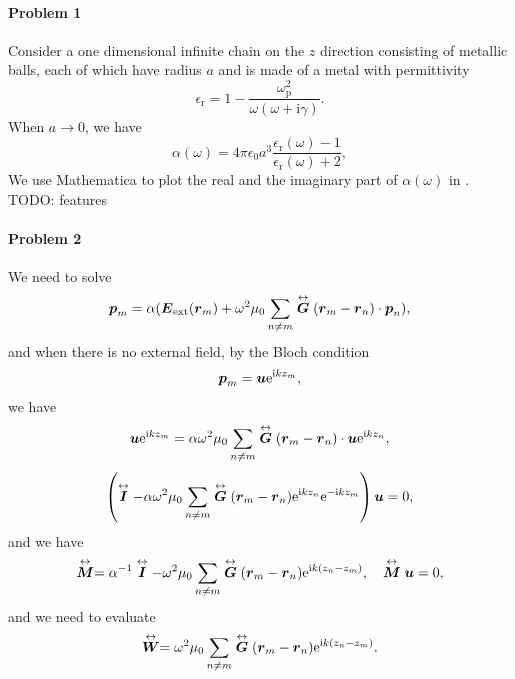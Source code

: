 \documentclass[hyperref, a4paper]{article}
\newcommand*{\ii}{\mathrm{i}}
\newcommand*{\ee}{\mathrm{e}}
\renewcommand{\tensor}[1]{ \stackrel{\leftrightarrow}{\vb*{#1}}}
\begin{document}
\paragraph{Problem 1} Consider a one dimensional infinite chain on the $z$ direction consisting of metallic balls, 
each of which have radius $a$ and is made of a metal with permittivity
\begin{equation}
    \epsilon_\text{r} = 1 - \frac{\omega_\text{p}^2}{\omega (\omega + \ii \gamma)}.
\end{equation} 
When $a \to 0$, we have
\begin{equation}
    \alpha(\omega) = 4 \pi \epsilon_0 a^3 \frac{\epsilon_\text{r}(\omega) - 1}{\epsilon_\text{r}(\omega) + 2},
\end{equation}
We use Mathematica to plot the real and the imaginary part of $\alpha(\omega)$ in . 
TODO: features

\paragraph{}

\paragraph{Problem 2} We need to solve 
\begin{equation}
    \vb*{p}_m = \alpha (\vb*{E}_\text{ext}(\vb*{r}_m) + \omega^2 \mu_0 \sum_{n \neq m} \tensor{\vb*{G}}(\vb*{r}_m - \vb*{r}_n) \cdot \vb*{p}_n),
    \label{eq:p-ext}
\end{equation}
and when there is no external field, by the Bloch condition 
\begin{equation}
    \vb*{p}_m = \vb*{u} \ee^{\ii k z_m},
\end{equation}
we have 
\[
    \vb*{u} \ee^{\ii k z_m} = \alpha \omega^2 \mu_0 \sum_{n \neq m} \tensor{\vb*{G}}(\vb*{r}_m - \vb*{r}_n) \cdot \vb*{u} \ee^{\ii k z_n},
\]
\[
    \left( \tensor{\vb*{I}} - \alpha \omega^2 \mu_0 \sum_{n \neq m} \tensor{\vb*{G}}(\vb*{r}_m - \vb*{r}_n) \ee^{\ii k z_n} \ee^{- \ii k z_m}  \right) \vb*{u}  = 0,
\]
and we have 
\begin{equation}
    \tensor{\vb*{M}} = \alpha^{-1} \tensor{ \vb*{I}} - \omega^2 \mu_0 \sum_{n \neq m} \tensor{\vb*{G}}(\vb*{r}_m - \vb*{r}_n) \ee^{\ii k (z_n - z_m)}, \quad \tensor{\vb*{M}} \vb*{u} = 0,
    \label{eq:eigen-problem}
\end{equation}
and we need to evaluate 
\begin{equation}
    \tensor{\vb*{W}} = \omega^2 \mu_0 \sum_{n \neq m} \tensor{\vb*{G}}(\vb*{r}_m - \vb*{r}_n) \ee^{\ii k (z_n - z_m)}.
    \label{eq:def-w}
\end{equation}
\end{document}

